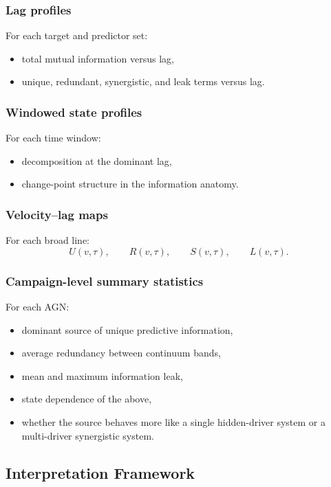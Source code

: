 \documentclass{article}
\begin{document}
\subsubsection{Lag profiles}

For each target and predictor set:
\begin{itemize}
    \item total mutual information versus lag,
    \item unique, redundant, synergistic, and leak terms versus lag.
\end{itemize}

\subsubsection{Windowed state profiles}

For each time window:
\begin{itemize}
    \item decomposition at the dominant lag,
    \item change-point structure in the information anatomy.
\end{itemize}

\subsubsection{Velocity--lag maps}

For each broad line:
\[
U(v,\tau), \qquad R(v,\tau), \qquad S(v,\tau), \qquad L(v,\tau).
\]

\subsubsection{Campaign-level summary statistics}

For each AGN:
\begin{itemize}
    \item dominant source of unique predictive information,
    \item average redundancy between continuum bands,
    \item mean and maximum information leak,
    \item state dependence of the above,
    \item whether the source behaves more like a single hidden-driver system or a multi-driver synergistic system.
\end{itemize}

\subsection{Interpretation Framework}
\end{document}
